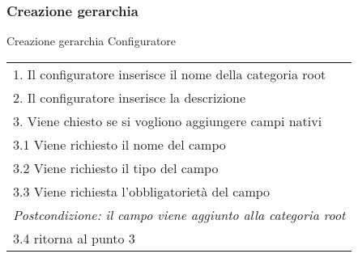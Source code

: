 \begin{minipage}{\textwidth}
    \subsubsection{Creazione gerarchia}
    \usecase
        {Creazione gerarchia}
        {Configuratore}
        {
            \begin{tabular}{l}
                1.  Il configuratore inserisce il nome della categoria root\\
                2.  Il configuratore inserisce la descrizione \\
                3.  Viene chiesto se si vogliono aggiungere campi nativi\\
                3.1 Viene richiesto il nome del campo\\
                3.2 Viene richiesto il tipo del campo\\
                3.3 Viene richiesta l'obbligatorietà del campo\\
                     \textit{Postcondizione: il campo viene aggiunto alla categoria root}\\
                3.4 ritorna al punto 3
            \end{tabular}\\
             \\
        }
        \vspace{0.5cm}
\end{minipage}